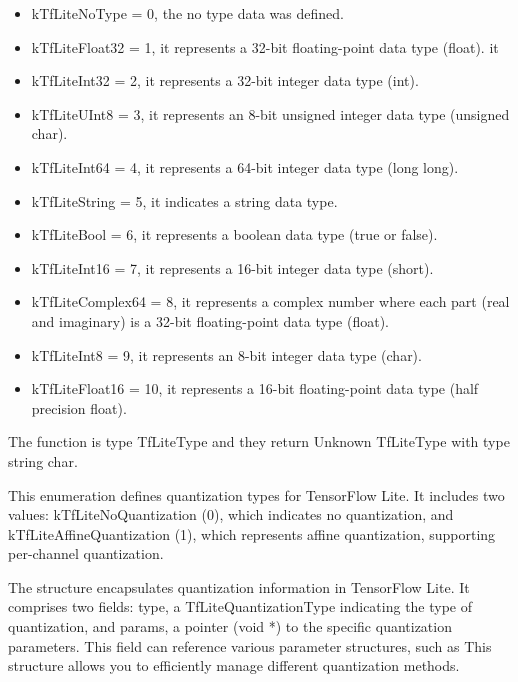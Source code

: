 \begin{itemize}
    \item kTfLiteNoType = 0, the no type data was defined.
    \item kTfLiteFloat32 = 1, it represents a 32-bit floating-point data type (float). it 
    \item kTfLiteInt32 = 2, it represents a 32-bit integer data type (int).
    \item kTfLiteUInt8 = 3, it  represents an 8-bit unsigned integer data type (unsigned char).
    \item kTfLiteInt64 = 4, it represents a 64-bit integer data type (long long). 
    \item kTfLiteString = 5, it indicates a string data type.
    \item kTfLiteBool = 6, it represents a boolean data type (true or false).
    \item kTfLiteInt16 = 7, it represents a 16-bit integer data type (short).
    \item kTfLiteComplex64 = 8, it represents a complex number where each part (real and imaginary) is a 32-bit floating-point data type (float).
    \item kTfLiteInt8 = 9, it represents an 8-bit integer data type (char).
    \item kTfLiteFloat16 = 10, it represents a 16-bit floating-point data type (half precision float).
\end{itemize}


\begin{center}
    \label{Figure:Comatibily}
\end{center}

The function  is type TfLiteType  and they return Unknown TfLiteType with type string char.

This enumeration  defines quantization types for TensorFlow Lite. It includes two values: kTfLiteNoQuantization (0), which indicates no quantization, and kTfLiteAffineQuantization (1), which represents affine quantization, supporting per-channel quantization. 

\bigskip

The structure  encapsulates quantization information in TensorFlow Lite. It comprises two fields: type, a TfLiteQuantizationType indicating the type of quantization, and params, a pointer (void *) to the specific quantization parameters. This field can reference various parameter structures, such as This structure allows you to efficiently manage different quantization methods.

